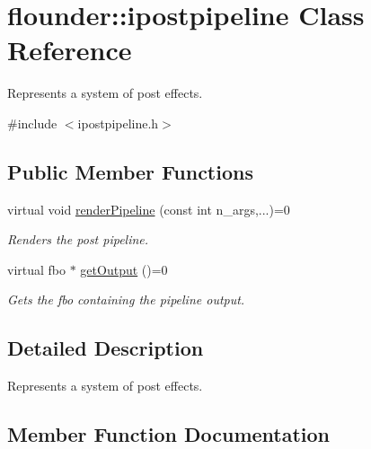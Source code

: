 \hypertarget{classflounder_1_1ipostpipeline}{}\section{flounder\+:\+:ipostpipeline Class Reference}
\label{classflounder_1_1ipostpipeline}


Represents a system of post effects.  




{\ttfamily \#include $<$ipostpipeline.\+h$>$}

\subsection*{Public Member Functions}
\begin{DoxyCompactItemize}
\item 
virtual void \hyperlink{classflounder_1_1ipostpipeline_a975b354967fa358076d02380feb55265}{render\+Pipeline} (const int n\+\_\+args,...)=0
\begin{DoxyCompactList}\small\item\em Renders the post pipeline. \end{DoxyCompactList}\item 
virtual fbo $\ast$ \hyperlink{classflounder_1_1ipostpipeline_a08f5d19b9652528337b73c2f4e0e4258}{get\+Output} ()=0
\begin{DoxyCompactList}\small\item\em Gets the fbo containing the pipeline output. \end{DoxyCompactList}\end{DoxyCompactItemize}


\subsection{Detailed Description}
Represents a system of post effects. 



\subsection{Member Function Documentation}
\mbox{\label{classflounder_1_1ipostpipeline_a08f5d19b9652528337b73c2f4e0e4258}} 
